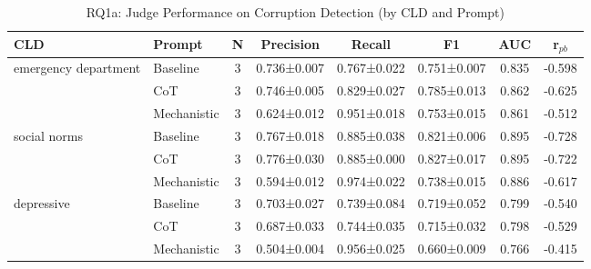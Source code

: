 \begin{table}[htbp]
\centering
\caption{RQ1a: Judge Performance on Corruption Detection (by CLD and Prompt)}
\label{tab:rq1a_main}
\begin{tabular}{llcccccc}
\toprule
\textbf{CLD} & \textbf{Prompt} & \textbf{N} & \textbf{Precision} & \textbf{Recall} & \textbf{F1} & \textbf{AUC} & \textbf{r$_{pb}$} \\
\midrule
emergency department & Baseline & 3 & 0.736±0.007 & 0.767±0.022 & 0.751±0.007 & 0.835 & -0.598 \\
 & CoT & 3 & 0.746±0.005 & 0.829±0.027 & 0.785±0.013 & 0.862 & -0.625 \\
 & Mechanistic & 3 & 0.624±0.012 & 0.951±0.018 & 0.753±0.015 & 0.861 & -0.512 \\
\midrule
social norms & Baseline & 3 & 0.767±0.018 & 0.885±0.038 & 0.821±0.006 & 0.895 & -0.728 \\
 & CoT & 3 & 0.776±0.030 & 0.885±0.000 & 0.827±0.017 & 0.895 & -0.722 \\
 & Mechanistic & 3 & 0.594±0.012 & 0.974±0.022 & 0.738±0.015 & 0.886 & -0.617 \\
\midrule
depressive & Baseline & 3 & 0.703±0.027 & 0.739±0.084 & 0.719±0.052 & 0.799 & -0.540 \\
 & CoT & 3 & 0.687±0.033 & 0.744±0.035 & 0.715±0.032 & 0.798 & -0.529 \\
 & Mechanistic & 3 & 0.504±0.004 & 0.956±0.025 & 0.660±0.009 & 0.766 & -0.415 \\
\midrule
\bottomrule
\end{tabular}
\end{table}
